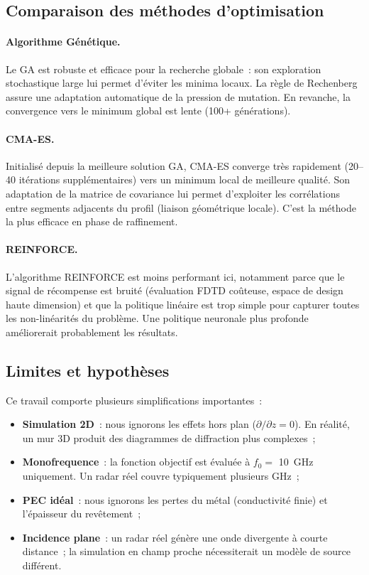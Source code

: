 \documentclass[12pt,a4paper]{article}
\begin{document}
\subsection{Comparaison des méthodes d'optimisation}

\paragraph{Algorithme Génétique.}
Le GA est robuste et efficace pour la recherche globale~: son exploration stochastique
large lui permet d'éviter les minima locaux. La règle de Rechenberg assure une
adaptation automatique de la pression de mutation. En revanche, la convergence vers
le minimum global est lente (100+ générations).

\paragraph{CMA-ES.}
Initialisé depuis la meilleure solution GA, CMA-ES converge très rapidement (20--40
itérations supplémentaires) vers un minimum local de meilleure qualité. Son adaptation
de la matrice de covariance lui permet d'exploiter les corrélations entre segments
adjacents du profil (liaison géométrique locale). C'est la méthode la plus efficace
en phase de raffinement.

\paragraph{REINFORCE.}
L'algorithme REINFORCE est moins performant ici, notamment parce que le signal de
récompense est bruité (évaluation FDTD coûteuse, espace de design haute dimension)
et que la politique linéaire est trop simple pour capturer toutes les non-linéarités
du problème. Une politique neuronale plus profonde améliorerait probablement les résultats.

\subsection{Limites et hypothèses}

Ce travail comporte plusieurs simplifications importantes~:
\begin{itemize}
    \item \textbf{Simulation 2D}~: nous ignorons les effets hors plan ($\partial/\partial z = 0$).
          En réalité, un mur 3D produit des diagrammes de diffraction plus complexes~;
    \item \textbf{Monofrequence}~: la fonction objectif est évaluée à $f_0 =$ \SI{10}{\giga\hertz}
          uniquement. Un radar réel couvre typiquement plusieurs GHz~;
    \item \textbf{PEC idéal}~: nous ignorons les pertes du métal (conductivité finie)
          et l'épaisseur du revêtement~;
    \item \textbf{Incidence plane}~: un radar réel génère une onde divergente à courte
          distance~; la simulation en champ proche nécessiterait un modèle de source
          différent.
\end{itemize}
\end{document}
